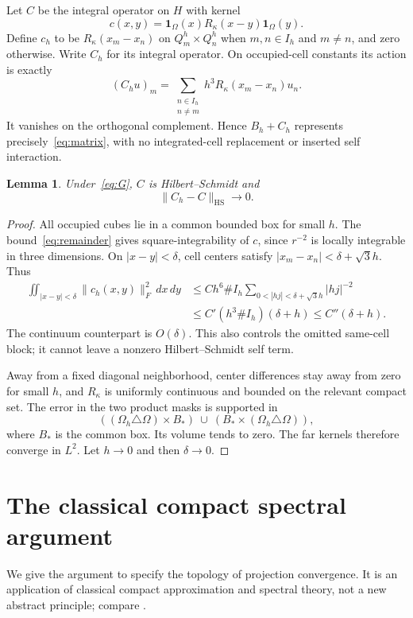 \documentclass[11pt]{article}
\newtheorem{lemma}[theorem]{Lemma}
\theoremstyle{remark}\newtheorem{remark}[theorem]{Remark}
\newcommand{\HS}{\mathrm{HS}}\newcommand{\lat}{\mathrm{lat}}
\begin{document}
Let $C$ be the integral operator on $H$ with kernel
\[
 c(x,y)=\mathbf1_\Omega(x)R_\kappa(x-y)\mathbf1_\Omega(y).
\]
Define $c_h$ to be $R_\kappa(x_m-x_n)$ on $Q_m^h\times Q_n^h$ when $m,n\in I_h$ and $m\ne n$, and zero otherwise. Write $C_h$ for its integral operator. On occupied-cell constants its action is exactly
\[
 (C_hu)_m=\sum_{\substack{n\in I_h\\n\ne m}}h^3R_\kappa(x_m-x_n)u_n.
\]
It vanishes on the orthogonal complement. Hence $B_h+C_h$ represents precisely~\eqref{eq:matrix}, with no integrated-cell replacement or inserted self interaction.

\begin{lemma}\label{lem:dynamic}
Under~\eqref{eq:G}, $C$ is Hilbert--Schmidt and
\[
 \|C_h-C\|_\HS\longrightarrow0.
\]
\end{lemma}
\begin{proof}
All occupied cubes lie in a common bounded box for small $h$. The bound~\eqref{eq:remainder} gives square-integrability of $c$, since $r^{-2}$ is locally integrable in three dimensions. On $|x-y|<\delta$, cell centers satisfy $|x_m-x_n|<\delta+\sqrt3h$. Thus
\begin{align*}
 \iint_{|x-y|<\delta}\|c_h(x,y)\|_F^2\,dx\,dy
 &\le C h^6\#I_h\sum_{0<|hj|<\delta+\sqrt3h}|hj|^{-2}\\
 &\le C'(h^3\#I_h)(\delta+h)\le C''(\delta+h).
\end{align*}
The continuum counterpart is $O(\delta)$. This also controls the omitted same-cell block; it cannot leave a nonzero Hilbert--Schmidt self term.

Away from a fixed diagonal neighborhood, center differences stay away from zero for small $h$, and $R_\kappa$ is uniformly continuous and bounded on the relevant compact set. The error in the two product masks is supported in
\[
 ((\Omega_h\triangle\Omega)\times B_*)\ \cup\
 (B_*\times(\Omega_h\triangle\Omega)),
\]
where $B_*$ is the common box. Its volume tends to zero. The far kernels therefore converge in $L^2$. Let $h\to0$ and then $\delta\to0$.
\end{proof}

\section{The classical compact spectral argument}\label{sec:spectral}

We give the argument to specify the topology of projection convergence. It is an application of classical compact approximation and spectral theory, not a new abstract principle; compare \cite{AP,AT,DNR}.
\end{document}

